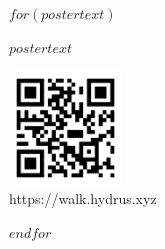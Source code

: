 \documentclass[12pt,a4paper]{book}
\begin{document}
\captionsetup[figure]{labelformat=empty}
\pagestyle{empty}

$for(postertext)$
\vspace*{\fill}
\begin{center}
    \begin{minipage}{1.0\textwidth}
        \centering 
         \textbf{$postertext$}
    \end{minipage}
\end{center}
\vfill %


\vspace*{0pt}\vfill
\hspace*{0pt}\hfill
    \begin{varwidth}{4in}
        \begin{center}
            \includegraphics[width=3cm]{qr-code}\\[1mm]
            \small https://walk.hydrus.xyz
        \end{center}
    \end{varwidth}

\clearpage

$endfor$
\end{document}
